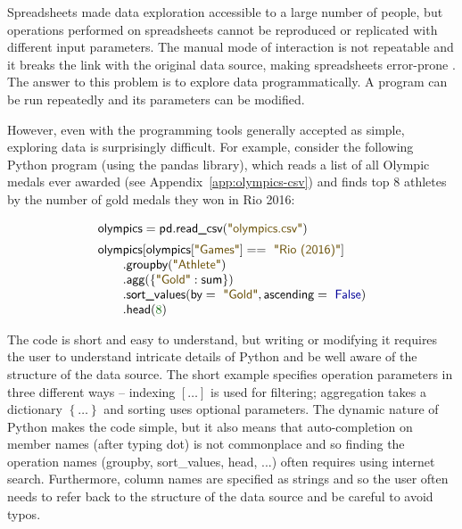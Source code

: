 \documentclass[a4paper,UKenglish]{lipics-v2016}
\theoremstyle{plain}
\theoremstyle{definition}
\newcommand{\num}[1]{\textcolor{numclr}{#1}}
\newcommand{\str}[1]{\textnormal{\textcolor{strclr}{\sffamily "#1"}}}
\newcommand{\kvd}[1]{\textnormal{\textcolor{kvdclr}{\sffamily #1}}}
\newcommand{\ident}[1]{\textnormal{\sffamily #1}}
\begin{document}
Spreadsheets made data exploration accessible to a large number of people, but operations 
performed on spreadsheets cannot be reproduced or replicated with different input parameters.
The manual mode of interaction is not repeatable and it breaks the link with the original data 
source, making spreadsheets error-prone \cite{exceldep}. The answer to this problem is to explore data 
programmatically. A program can be run repeatedly and its parameters can be modified.

However, even with the programming tools generally accepted as simple, exploring data is 
surprisingly difficult. For example, consider the following Python program (using the pandas
library), which reads a list of all Olympic medals ever awarded (see Appendix~\ref{app:olympics-csv}) 
and finds top 8 athletes by the number of gold medals they won in Rio 2016:

\noindent
\begin{equation*}
\begin{array}{l}
\ident{olympics} = \ident{pd.read\_csv}(\str{olympics.csv})\\[0.5em]
\ident{olympics}[\ident{olympics}[\str{Games}]==\str{Rio (2016)}]\\
\qquad .\ident{groupby}(\str{Athlete})\\
\qquad .\ident{agg}(\left\{\str{Gold}:\ident{sum}\right\})\\
\qquad .\ident{sort\_values}(\ident{by}=\str{Gold}, \ident{ascending}=\kvd{False})\\
\qquad .\ident{head}(\num{8})
\end{array}
\end{equation*}

\noindent
The code is short and easy to understand, but writing or modifying it requires the user to 
understand intricate details of Python and be well aware of the structure of the data source. 
The short example specifies operation parameters in three different ways -- indexing $[\ldots]$ 
is used for filtering; aggregation takes a dictionary $\left\{\ldots\right\}$ and sorting uses 
optional parameters. The dynamic nature of Python makes the code simple, but it also means that
auto-completion on member names (after typing dot) is not commonplace and so finding the operation
names (\ident{groupby}, \ident{sort\_values}, \ident{head}, ...) often requires using internet 
search. Furthermore, column names are specified as strings and so the user often needs to refer back
to the structure of the data source and be careful to avoid typos.
\end{document}
